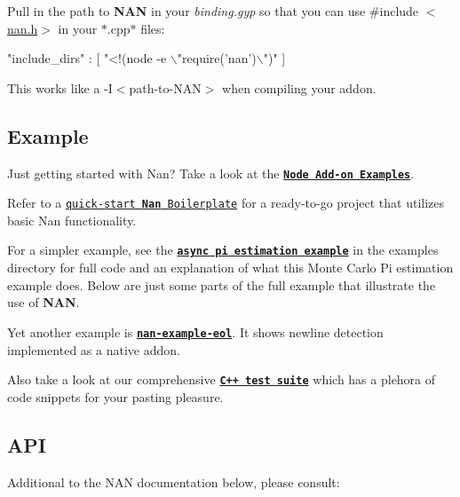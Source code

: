

Pull in the path to {\bfseries N\+AN} in your {\itshape binding.\+gyp} so that you can use {\ttfamily \#include $<$\hyperlink{nan_8h_source}{nan.\+h}$>$} in your $\ast$.cpp$\ast$ files\+:


\begin{DoxyCode}
"include\_dirs" : [
    "<!(node -e \(\backslash\)"require('nan')\(\backslash\)")"
]
\end{DoxyCode}


This works like a {\ttfamily -\/I$<$path-\/to-\/\+N\+AN$>$} when compiling your addon.

\label{_example}%
 \subsection*{Example}

Just getting started with Nan? Take a look at the {\bfseries \href{https://github.com/nodejs/node-addon-examples}{\tt Node Add-\/on Examples}}.

Refer to a \href{https://github.com/fcanas/node-native-boilerplate}{\tt quick-\/start {\bfseries Nan} Boilerplate} for a ready-\/to-\/go project that utilizes basic Nan functionality.

For a simpler example, see the {\bfseries \href{https://github.com/nodejs/nan/tree/master/examples/async_pi_estimate}{\tt async pi estimation example}} in the examples directory for full code and an explanation of what this Monte Carlo Pi estimation example does. Below are just some parts of the full example that illustrate the use of {\bfseries N\+AN}.

Yet another example is {\bfseries \href{https://github.com/CodeCharmLtd/nan-example-eol}{\tt nan-\/example-\/eol}}. It shows newline detection implemented as a native addon.

Also take a look at our comprehensive {\bfseries \href{https://github.com/nodejs/nan/tree/master/test/cpp}{\tt C++ test suite}} which has a plehora of code snippets for your pasting pleasure.

\label{_api}%
 \subsection*{A\+PI}

Additional to the N\+AN documentation below, please consult\+:


